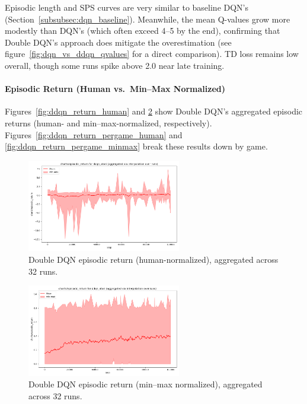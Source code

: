 Episodic length and SPS curves are very similar to baseline DQN's (Section~\ref{subsubsec:dqn_baseline}). 
Meanwhile, the mean Q-values grow more modestly than DQN's (which often exceed 4--5 by the end), confirming 
that Double DQN's approach does mitigate the overestimation (see figure~\vref{fig:dqn_vs_ddqn_qvalues} for a direct comparison).
TD loss remains low overall, though some runs spike above 2.0 near late training.

\paragraph{Episodic Return (Human vs.\ Min--Max Normalized)}
Figures~\vref{fig:ddqn_return_human} and \ref{fig:ddqn_return_minmax} show Double DQN’s aggregated episodic returns (human- and min--max-normalized, respectively). 
Figures~\ref{fig:ddqn_return_pergame_human} and \ref{fig:ddqn_return_pergame_minmax} break these results down by game.

\begin{figure}
	\centering
	\includegraphics[width=0.6\textwidth]{figures/ddqn/charts_episodic_return_human_ddqn_atari.png}
	\caption{Double DQN episodic return (human-normalized), aggregated across 32 runs.}
	\label{fig:ddqn_return_human}
\end{figure}

\begin{figure}
	\centering
	\includegraphics[width=0.6\textwidth]{figures/ddqn/charts_episodic_return_minmax_ddqn_atari.png}
	\caption{Double DQN episodic return (min--max normalized), aggregated across 32 runs.}
	\label{fig:ddqn_return_minmax}
\end{figure}

